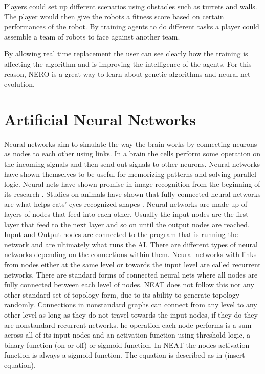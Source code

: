 \documentclass[12pt]{ucthesis} \newif\ifpdf \ifx\pdfoutput\undefined
\begin{document}
Players could set up different scenarios using obstacles such as turrets and
walls. The player would then give the robots a fitness score based on certain
performances of the robot. By training agents to do different tasks a player
could assemble a team of robots to face against another team.

By allowing real time replacement the user can see clearly how the training is
affecting the algorithm and is improving the intelligence of the agents. For
this reason, NERO is a great way to learn about genetic algorithms and neural
net evolution.

\section{Artiﬁcial Neural Networks}

Neural networks aim to simulate the way the brain works by connecting neurons as
nodes to each other using links. In a brain the cells perform some operation on
the incoming signals and then send out signals to other neurons.
Neural networks have shown themselves to be useful for memorizing patterns and
solving parallel logic. Neural nets have shown promise in image recognition from
the beginning of its research \cite{lippmann}. Studies on animals have shown
that fully connected neural networks are what helps cats’ eyes recognized shapes
\cite{hubel1959receptive}.
Neural networks are made up of layers of nodes that feed into each other.
Usually the input nodes are the first layer that feed to the next layer and so
on until the output nodes are reached. Input and Output nodes are connected to
the program that is running the network and are ultimately what runs the AI.
There are different types of neural networks depending on the connections within
them. Neural networks with links from nodes either at the same level or towards
the input level are called recurrent networks. There are standard forms of
connected neural nets where all nodes are fully connected between each level of
nodes. NEAT does not follow this nor any other standard set of topology form,
due to its ability to generate topology randomly. Connections in nonstandard
graphs can connect from any level to any other level as long as they do not
travel towards the input nodes, if they do they are nonstandard recurrent
networks.
he operation each node performs is a sum across all of its input nodes and an
activation function using threshold logic, a binary function (on or off) or
sigmoid function. In NEAT the nodes activation function is always a sigmoid
function. The equation is described as in (insert equation).
\end{document}
